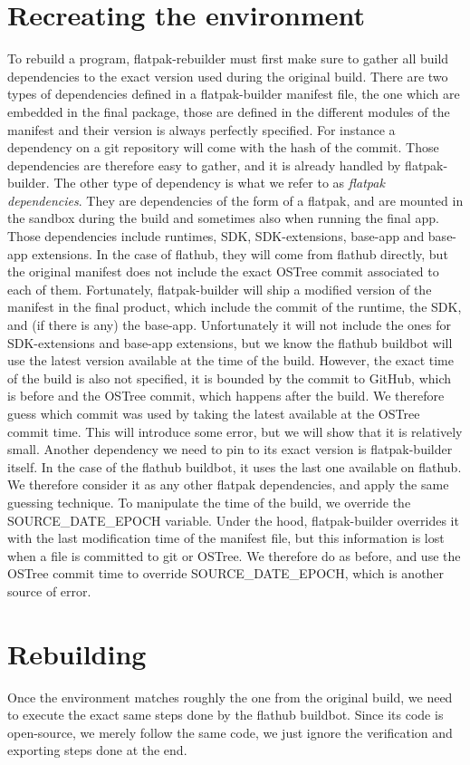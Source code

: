 \documentclass[a4paper,11pt,oneside]{report}
\theoremstyle{definition}
\newcommand{\sysname}{flatpak-rebuilder\xspace}
\newcommand{\fp}{flatpak\xspace}
\newcommand{\fh}{flathub\xspace}
\newcommand{\fb}{flatpak-builder\xspace}
\newcommand{\fdp}{flatpak dependencies\xspace}
\newcommand{\sde}{SOURCE\_DATE\_EPOCH\xspace}
\newcommand{\fhbb}{flathub buildbot\xspace}
\newcommand{\ot}{OSTree\xspace}
\begin{document}
\section{Recreating the environment}
To rebuild a program, \sysname must first make sure to gather all build
dependencies to the exact version used during the original build. There are two
types of dependencies defined in a \fb manifest file, the one which are
embedded in the final package, those are defined in the different modules of
the manifest and their version is always perfectly specified. For instance a
dependency on a git repository will come with the hash of the commit. Those
dependencies are therefore easy to gather, and it is already handled by \fb.
The other type of dependency is what we refer to as \emph{\fdp}. They are
dependencies of the form of a \fp, and are mounted in the sandbox during the
build and sometimes also when running the final app. Those dependencies include
runtimes, SDK, SDK-extensions, base-app and base-app extensions. In the case of
\fh, they will come from \fh directly, but the original manifest does not
include the exact \ot commit associated to each of them. Fortunately, \fb will
ship a modified version of the manifest in the final product, which include the
commit of the runtime, the SDK, and (if there is any) the base-app.
Unfortunately it will not include the ones for SDK-extensions and base-app
extensions, but we know the \fhbb will use the latest version available at the
time of the build. However, the exact time of the build is also not specified,
it is bounded by the commit to GitHub, which is before and the \ot commit,
which happens after the build. We therefore guess which commit was used by
taking the latest available at the \ot commit time. This will introduce some
error, but we will show that it is relatively small. Another dependency we need
to pin to its exact version is \fb itself. In the case of the \fhbb, it uses
the last one available on \fh. We therefore consider it as any other \fdp, and
apply the same guessing technique.
To manipulate the time of the build, we override the \sde variable. Under the
hood, \fb overrides it with the last modification time of the manifest file,
but this information is lost when a file is committed to git or \ot . We
therefore do as before, and use the \ot commit time to override \sde, which is
another source of error.

\section{Rebuilding}
Once the environment matches roughly the one from the original build, we need
to execute the exact same steps done by the \fhbb. Since its code is
open-source, we merely follow the same code, we just ignore the verification
and exporting steps done at the end.
\end{document}
